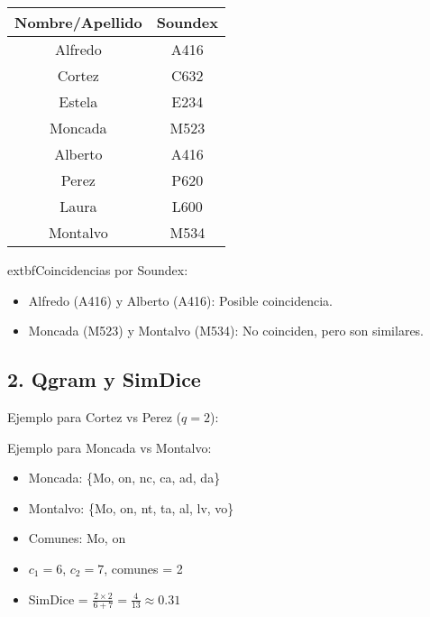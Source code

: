 \documentclass{article}
\begin{document}
\vspace{0.5em}
\begin{tabular}{|c|c|}
\hline
Nombre/Apellido & Soundex \\
\hline
Alfredo & A416 \\
Cortez & C632 \\
Estela & E234 \\
Moncada & M523 \\
Alberto & A416 \\
Perez & P620 \\
Laura & L600 \\
Montalvo & M534 \\
\hline
\end{tabular}

\vspace{1em}

	extbf{Coincidencias por Soundex:}
\begin{itemize}
    \item Alfredo (A416) y Alberto (A416): Posible coincidencia.
    \item Moncada (M523) y Montalvo (M534): No coinciden, pero son similares.
\end{itemize}

\subsection*{2. Qgram y SimDice}

Ejemplo para Cortez vs Perez ($q=2$):


Ejemplo para Moncada vs Montalvo:

\begin{itemize}
    \item Moncada: \{Mo, on, nc, ca, ad, da\}
    \item Montalvo: \{Mo, on, nt, ta, al, lv, vo\}
    \item Comunes: Mo, on
    \item $c_1 = 6$, $c_2 = 7$, comunes = 2
    \item SimDice = $ =  $
\end{itemize}
\end{document}

